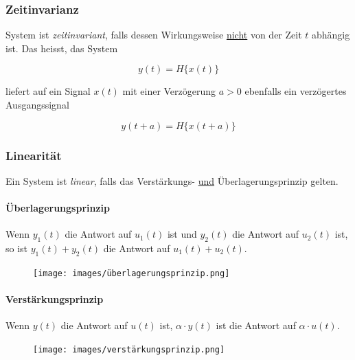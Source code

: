 \documentclass[
  10pt,
  a4paper,
  twocolumn]{article}
\let\oldparagraph\paragraph
\renewcommand{\paragraph}[1]{\oldparagraph{#1}\mbox{}}
\numberwithin{equation}{section}
\let\paragraph\oldparagraph
\renewcommand{\paragraph}[1]{\oldparagraph{#1}\mbox{}\par}
\begin{document}
\hypertarget{zeitinvarianz}{%
\subsubsection{Zeitinvarianz}\label{zeitinvarianz}}

System ist \emph{zeitinvariant}, falls dessen Wirkungsweise \ul{nicht}
von der Zeit \(t\) abhängig ist. Das heisst, das System

\[ y(t) = H\{x(t)\} \]

liefert auf ein Signal \(x(t)\) mit einer Verzögerung \(a>0\) ebenfalls
ein verzögertes Ausgangssignal

\[ y(t+a)=H\{x(t+a)\} \]

\hypertarget{linearituxe4t}{%
\subsubsection{Linearität}\label{linearituxe4t}}

Ein System ist \emph{linear}, falls das Verstärkungs- \ul{und}
Überlagerungsprinzip gelten.

\hypertarget{uxfcberlagerungsprinzip}{%
\paragraph{Überlagerungsprinzip}\label{uxfcberlagerungsprinzip}}

Wenn \(y_1(t)\) die Antwort auf \(u_1(t)\) ist und \(y_2(t)\) die
Antwort auf \(u_2(t)\) ist, so ist \(y_1(t) + y_2(t)\) die Antwort auf
\(u_1(t) + u_2(t)\).

\begin{figure}[H]

{\centering \texttt{[image: images/überlagerungsprinzip.png]}

}

\end{figure}

\hypertarget{verstuxe4rkungsprinzip}{%
\paragraph{Verstärkungsprinzip}\label{verstuxe4rkungsprinzip}}

Wenn \(y(t)\) die Antwort auf \(u(t)\) ist, \(\alpha\cdot y(t)\) ist die
Antwort auf \(\alpha\cdot u(t)\).

\begin{figure}[H]

{\centering \texttt{[image: images/verstärkungsprinzip.png]}

}

\end{figure}
\end{document}
